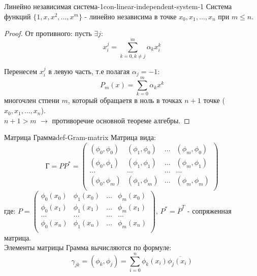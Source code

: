 \documentclass[14pt]{extarticle}
\begin{document}
    \begin{consequence}{Линейно независимая система-1}{con-linear-independent-system-1}
        Система функций $\{1, x, x^{2}, \ldots, x^{m}\}$ - линейно независима в точке $x_{0}, x_{1}, \ldots, x_{n}$ при $m \leq n$.

        \begin{proof}
            От противного: пусть $\exists j$:
            $$x_{i}^{j} = \sum_{k=0, k \neq j}^{m} \alpha_{k} x_{i}^{k}$$
            
            Перенесем $x_{i}^{j}$ в левую часть, т.е полагая $\alpha_{j} = -1$:
            $$P_{m}(x) = \sum_{k = 0}^{m}\alpha_{k} x^{k}$$
            многочлен стпени $m$, который обращаетя в ноль в точках $n+1$ точке ($x_{0}, x_{1}, \ldots, x_{n}$).\\
            $n+1 > m$ $\rightarrow$ противоречие основной теореме алгебры.
        \end{proof}
    \end{consequence}

    \begin{definition}{Матрица Грамма}{def-Gram-matrix}
        Матрица вида:
        $$
        \text{Г} = PP^{*} = \begin{pmatrix}
        (\phi_{0}, \phi_{0}) & (\phi_{1}, \phi_{0}) & \ldots & (\phi_{m}, \phi_{0})\\    
        (\phi_{0}, \phi_{1}) & (\phi_{1}, \phi_{1}) & \ldots & (\phi_{m}, \phi_{1})\\
        \ldots & \ldots & \ldots & \ldots\\
        (\phi_{0}, \phi_{m}) & (\phi_{1}, \phi_{m}) & \ldots & (\phi_{m}, \phi_{m})\\
        \end{pmatrix}
        $$
        где: $
        P = \begin{pmatrix}
            \phi_{0}(x_{0}) & \phi_{1}(x_{0}) & \ldots & \phi_{m}(x_{0})\\
            \phi_{0}(x_{1}) & \phi_{1}(x_{1}) & \ldots & \phi_{m}(x_{1})\\
            \ldots & \ldots & \ldots & \ldots\\
            \phi_{0}(x_{n}) & \phi_{1}(x_{n}) & \ldots & \phi_{m}(x_{n})\\
        \end{pmatrix}    
        $, $P^{*} = \overline{P}^{T}$ - сопряженная матрица.\\

        Элементы матрицы Грамма вычисляются по формуле:
        $$\gamma_{jk} = (\phi_{k}, \phi_{j}) = \sum_{i=0}^{n}\phi_{k}(x_{i})\overline{\phi_{j}(x_{i})}$$
    \end{definition}
\end{document}
